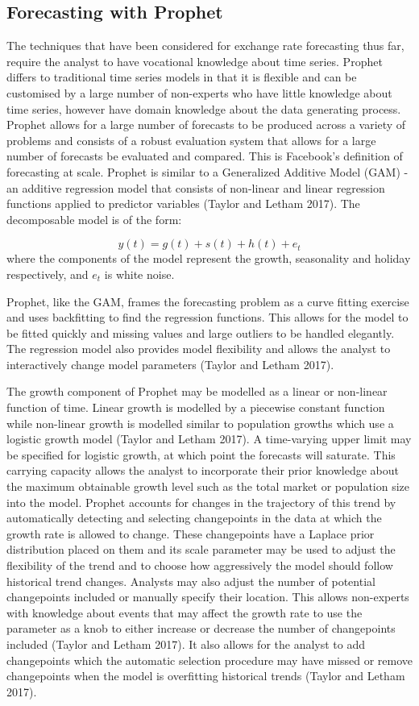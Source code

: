 \documentclass[12pt,a4paper]{article}
\numberwithin{equation}{section}
\numberwithin{figure}{section}
\numberwithin{table}{section}
\begin{document}
\subsection{Forecasting with Prophet}\label{forecasting-with-prophet}

The techniques that have been considered for exchange rate forecasting
thus far, require the analyst to have vocational knowledge about time
series. Prophet differs to traditional time series models in that it is
flexible and can be customised by a large number of non-experts who have
little knowledge about time series, however have domain knowledge about
the data generating process. Prophet allows for a large number of
forecasts to be produced across a variety of problems and consists of a
robust evaluation system that allows for a large number of forecasts be
evaluated and compared. This is Facebook's definition of forecasting at
scale. Prophet is similar to a Generalized Additive Model (GAM) - an
additive regression model that consists of non-linear and linear
regression functions applied to predictor variables (Taylor and Letham
2017). The decomposable model is of the form:

\[ 
    y(t) = g(t) + s(t) + h(t) + e_t
\] where the components of the model represent the growth, seasonality
and holiday respectively, and \(e_t\) is white noise.

Prophet, like the GAM, frames the forecasting problem as a curve fitting
exercise and uses backfitting to find the regression functions. This
allows for the model to be fitted quickly and missing values and large
outliers to be handled elegantly. The regression model also provides
model flexibility and allows the analyst to interactively change model
parameters (Taylor and Letham 2017).

The growth component of Prophet may be modelled as a linear or
non-linear function of time. Linear growth is modelled by a piecewise
constant function while non-linear growth is modelled similar to
population growths which use a logistic growth model (Taylor and Letham
2017). A time-varying upper limit may be specified for logistic growth,
at which point the forecasts will saturate. This carrying capacity
allows the analyst to incorporate their prior knowledge about the
maximum obtainable growth level such as the total market or population
size into the model. Prophet accounts for changes in the trajectory of
this trend by automatically detecting and selecting changepoints in the
data at which the growth rate is allowed to change. These changepoints
have a Laplace prior distribution placed on them and its scale parameter
may be used to adjust the flexibility of the trend and to choose how
aggressively the model should follow historical trend changes. Analysts
may also adjust the number of potential changepoints included or
manually specify their location. This allows non-experts with knowledge
about events that may affect the growth rate to use the parameter as a
knob to either increase or decrease the number of changepoints included
(Taylor and Letham 2017). It also allows for the analyst to add
changepoints which the automatic selection procedure may have missed or
remove changepoints when the model is overfitting historical trends
(Taylor and Letham 2017).
\end{document}

